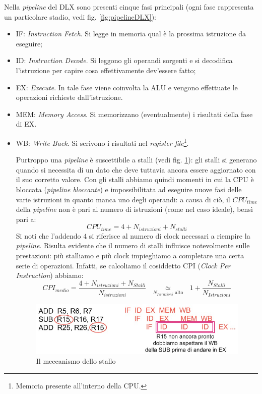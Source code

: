 Nella \textit{pipeline} del DLX sono presenti cinque fasi principali (ogni fase rappresenta un particolare stadio, vedi fig. \ref{fig:pipelineDLX}):
\begin{itemize}
\item IF: \textit{Instruction Fetch}. Si legge in memoria qual è la prossima istruzione da eseguire;
\item ID: \textit{Instruction Decode}. Si leggono gli operandi sorgenti e si decodifica l'istruzione per capire cosa effettivamente dev'essere fatto;
\item EX: \textit{Execute}. In tale fase viene coinvolta la ALU e vengono effettuate le operazioni richieste dall'istruzione.
\item MEM: \textit{Memory Access}. Si memorizzano (eventualmente) i risultati della fase di EX.
\item WB: \textit{Write Back}. Si scrivono i risultati nel \textit{register file}\footnote{Memoria presente all'interno della CPU.}.

Purtroppo una \textit{pipeline} è suscettibile a stalli (vedi fig. \ref{fig:stallo}): gli stalli si generano quando si necessita di un dato che deve tuttavia ancora essere aggiornato con il suo corretto valore. Con gli stalli abbiamo quindi momenti in cui la CPU è bloccata (\textit{pipeline bloccante}) e impossibilitata ad eseguire nuove fasi delle varie istruzioni in quanto manca uno degli operandi: a causa di ciò, il $CPU_{time}$ della \textit{pipeline} non è pari al numero di istruzioni (come nel caso ideale), bensì pari a:
\[
CPU_{time} = 4 + N_{istruzioni}  + N_{stalli}
\]
Si noti che l'addendo $4$ si riferisce al numero di clock necessari a riempire la \textit{pipeline}. Risulta evidente che il numero di stalli influisce notevolmente sulle prestazioni: più stalliamo e più clock impieghiamo a completare una certa serie di operazioni. Infatti, se calcoliamo il cosiddetto CPI (\textit{Clock Per Instruction}) abbiamo:
\[
CPI_{medio}=\dfrac{4+N_{istruzioni}+N_{Stalli}}{N_{istruzioni}} ~~~
\mathop  \simeq \limits_{N_{Istruzioni} {\text{ alto}}} 
 ~~~
 1+\dfrac{N_{Stalli}}{N_{Istruzioni}}
\]

\begin{figure}[!h]
\centering
\includegraphics[width=0.8\columnwidth]{img/stallo}
\caption{Il meccanismo dello stallo}
\label{fig:stallo}
\end{figure}

\end{itemize}

